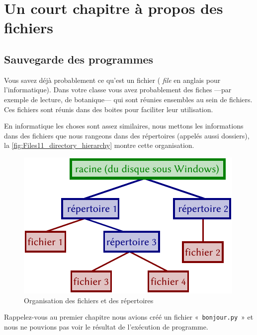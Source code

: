 



\chapter{Un court chapitre à propos des fichiers}\label{ch:ashortchapteraboutfiles}
\section{Sauvegarde des programmes}

Vous savez déjà probablement ce qu'est un fichier ( \emph{file} en anglais pour l'informatique).
Dans votre classe vous avez probablement des fiches ---par exemple de lecture, de botanique--- qui sont réunies ensembles au sein de fichiers. Ces fichiers sont réunis dans des boites pour faciliter leur utilisation.

En informatique les choses sont assez similaires, nous mettons les informations dans des fichiers que nous rangeons dans des répertoires (appelés aussi dossiers), la \autoref{fig:Files11_directory_hierarchy} montre cette organisation.

\begin{figure}[h!]
\centering
\includegraphics[scale=1]{images/Files11_directory_hierarchy.pdf}
\caption{Organisation des fichiers et des répertoires}\label{fig:Files11_directory_hierarchy}
\end{figure}


Rappelez-vous au premier chapitre nous avions créé un fichier «~\texttt{bonjour.py}~» et nous ne pouvions pas voir le résultat de l'exécution de programme.

